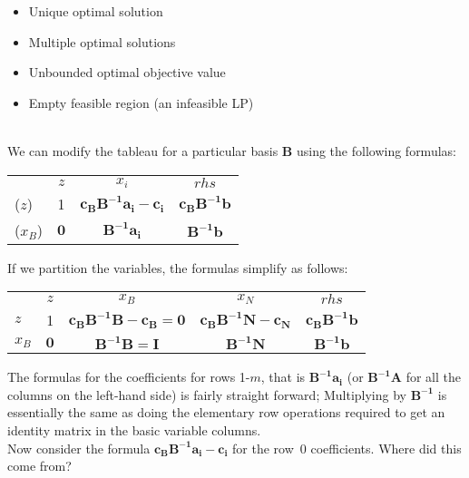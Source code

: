 \begin{itemize}
\item Unique optimal solution 
\item Multiple optimal solutions
\item Unbounded optimal objective value
\item Empty feasible region (an infeasible LP)
\end{itemize}

\vspace{10mm}{\bf Tableau Formulas:} \\

We can modify the tableau for a particular basis $\mathbf{B}$ using the following formulas:
\begin{center} \begin{tabular} {l|c|c|c|} \cline{2-4}
                    & $z$	        & $x_i$	                       &  $rhs$  \\ \cline{2-4}
 ($z$)         & 1	            & $\mathbf{c_BB^{-1}a_i -c_i}$ & $\mathbf{c_BB^{-1}b}$	    \\
 ($x_B$)  & $\mathbf{0}$	& $\mathbf{B^{-1}a_i}$	       & $\mathbf{B^{-1}b}$  \\ \cline{2-4}
\end{tabular} \end{center}
If we partition the variables, the formulas simplify as follows:
\begin{center} \begin{tabular} {l|c|c|c|c|} \cline{2-5}
       & $z$          & $x_{B}$	 & $x_{N}$                            & $rhs$ \\ \cline{2-5}
$z$    & 1	          & $\mathbf{c_BB^{-1}B-c_B=0}$ & $\mathbf{c_BB^{-1}N-c_{N}}$ & $\mathbf{c_BB^{-1}b}$ \\
$x_B$  & $\mathbf{0}$ & $\mathbf{B^{-1}B=I}$ & $\mathbf{B^{-1}N}$	       & $\mathbf{B^{-1}b}$ \\ \cline{2-5}
\end{tabular} \end{center} 

\bigskip The formulas for the coefficients for rows 1-$m$, that is $\mathbf{B^{-1}a_i}$ (or $\mathbf{B^{-1}A}$ for all the columns on the left-hand side) is fairly straight forward; Multiplying by $\mathbf{B^{-1}}$ is essentially the same as doing the elementary row operations required to get an identity matrix in the basic variable columns.  \\

Now consider the formula $\mathbf{c_BB^{-1}a_i -c_i}$ for the row~0 coefficients. Where did this come from? \\


